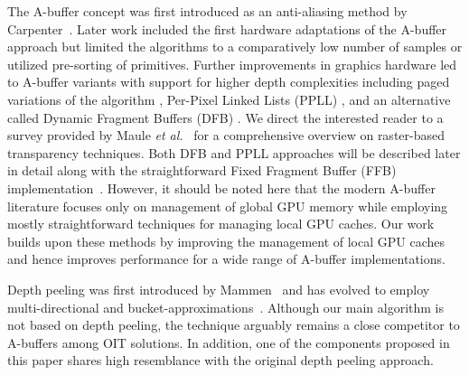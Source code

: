\documentclass{egpubl}
\def\etal{\emph{et al.}}
\newcommand{\red}[1]{{\color{red}#1}}
\newcommand{\ab}{\mbox{A-buffer}}
\begin{document}
The \ab{} concept was first introduced as an anti-aliasing method by Carpenter~\cite{Carpenter1984}. 
Later work \cite{ebert1990abuffer,callahan2005kbuffer,bavoil2007multifragkbuffer,myers2007techrep} included the first hardware adaptations of the \ab{} approach but limited the algorithms to a comparatively low number of samples or utilized pre-sorting of primitives. 
Further improvements in graphics hardware led to \ab{} variants with support for higher depth complexities including paged variations of the algorithm \cite{kainz2009ray,Crassin2010}, Per-Pixel Linked Lists (PPLL) \cite{Yang2010}, and an alternative called Dynamic Fragment Buffers (DFB) \cite{Maule2012}. 
We direct the interested reader to a survey provided by Maule \etal~\cite{Maule2011} for a comprehensive overview on raster-based transparency techniques.
%
Both DFB and PPLL approaches will be described later in detail along with the straightforward Fixed Fragment Buffer (FFB) implementation~\cite{Crassin2010}. 
However, it should be noted here that the modern \ab{} literature focuses only on management of global GPU memory while employing mostly straightforward techniques for managing local GPU caches. 
Our work builds upon these methods by improving the management of local GPU caches and hence improves performance for a wide range of \ab{} implementations.

Depth peeling was first introduced by Mammen~\cite{Mammen1989} and has evolved to employ multi-directional and bucket-approximations~\cite{Everitt2001,wexler2005hiddensurface,carr2008depthpeel,Bavoil2008,Liu2009}. 
Although our main algorithm is not based on depth peeling, the technique arguably remains a close competitor to \ab{}s among OIT solutions. 
In addition, one of the components proposed in this paper shares high resemblance with the original depth peeling approach. 


\end{document}
